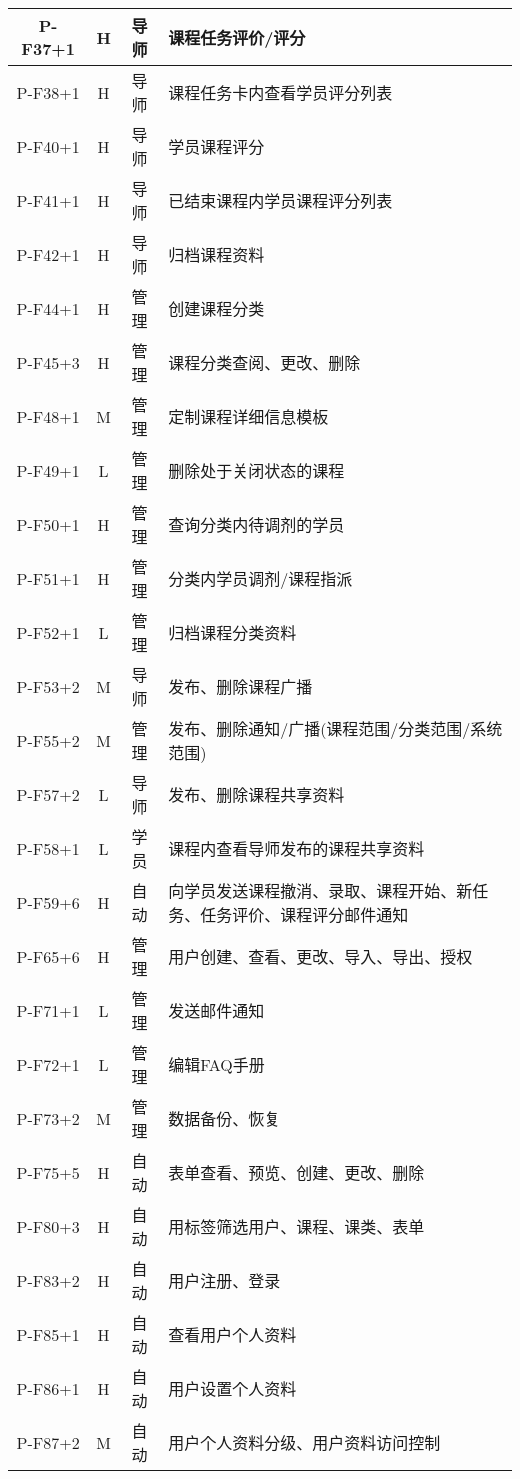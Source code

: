\begin{longtable}{|c|c|c|X|}
  P-F37+1 & H & 导师 & 课程任务评价/评分 \\ \hline
  P-F38+1 & H & 导师 & 课程任务卡内查看学员评分列表 \\ \hline
  P-F40+1 & H & 导师 & 学员课程评分 \\ \hline
  P-F41+1 & H & 导师 & 已结束课程内学员课程评分列表 \\ \hline
  P-F42+1 & H & 导师 & 归档课程资料 \\ \hline
  P-F44+1 & H & 管理 & 创建课程分类 \\ \hline
  P-F45+3 & H & 管理 & 课程分类查阅、更改、删除 \\ \hline
  P-F48+1 & M & 管理 & 定制课程详细信息模板 \\ \hline
  P-F49+1 & L & 管理 & 删除处于关闭状态的课程 \\ \hline
  P-F50+1 & H & 管理 & 查询分类内待调剂的学员 \\ \hline
  P-F51+1 & H & 管理 & 分类内学员调剂/课程指派 \\ \hline
  P-F52+1 & L & 管理 & 归档课程分类资料 \\ \hline
  P-F53+2 & M & 导师 & 发布、删除课程广播 \\ \hline
  P-F55+2 & M & 管理 & 发布、删除通知/广播(课程范围/分类范围/系统范围) \\ \hline
  P-F57+2 & L & 导师 & 发布、删除课程共享资料 \\ \hline
  P-F58+1 & L & 学员 & 课程内查看导师发布的课程共享资料 \\ \hline
  P-F59+6 & H & 自动 & 向学员发送课程撤消、录取、课程开始、新任务、任务评价、课程评分邮件通知 \\ \hline
  P-F65+6 & H & 管理 & 用户创建、查看、更改、导入、导出、授权 \\ \hline
  P-F71+1 & L & 管理 & 发送邮件通知 \\ \hline
  P-F72+1 & L & 管理 & 编辑FAQ手册 \\ \hline
  P-F73+2 & M & 管理 & 数据备份、恢复 \\ \hline
  P-F75+5 & H & 自动 & 表单查看、预览、创建、更改、删除 \\ \hline
  P-F80+3 & H & 自动 & 用标签筛选用户、课程、课类、表单 \\ \hline
  P-F83+2 & H & 自动 & 用户注册、登录 \\ \hline
  P-F85+1 & H & 自动 & 查看用户个人资料 \\ \hline
  P-F86+1 & H & 自动 & 用户设置个人资料 \\ \hline
  P-F87+2 & M & 自动 & 用户个人资料分级、用户资料访问控制 \\ \hline

\end{longtable}

